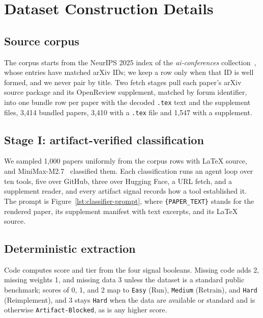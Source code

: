 \section{Dataset Construction Details}
\label{app:construction}

\subsection{Source corpus}
\label{app:corpus}

The corpus starts from the NeurIPS 2025 index of the \emph{ai-conferences}
collection~\citep{neurips2025corpus}, whose entries have matched arXiv IDs; we
keep a row only when that ID is well formed, and we never pair by title. Two
fetch stages pull each paper's arXiv source package and its OpenReview supplement,
matched by forum identifier, into one bundle row per paper with the decoded
\texttt{.tex} text and the supplement files, 3,414 bundled papers, 3,410 with
a \texttt{.tex} file and 1,547 with a supplement.

\subsection{Stage I: artifact-verified classification}
\label{app:classifier}

We sampled 1,000 papers uniformly from the corpus rows with LaTeX source, and
MiniMax-M2.7~\citep{minimax2026m2} classified them.
Each classification runs an agent loop over ten tools, five over GitHub, three
over Hugging Face, a URL fetch, and a supplement reader, and every artifact
signal records how a tool established it. The prompt is
Figure~\ref{lst:classifier-prompt}, where \texttt{\{PAPER\_TEXT\}} stands for
the rendered paper, its supplement manifest with text excerpts, and its LaTeX
source.

\subsection{Deterministic extraction}
\label{app:extraction}

Code computes score and tier from the four signal booleans. Missing code adds
2, missing weights 1, and missing data 3 unless the dataset is a standard
public benchmark; scores of 0, 1, and 2 map to \texttt{Easy} (Run),
\texttt{Medium} (Retrain), and \texttt{Hard} (Reimplement), and 3 stays
\texttt{Hard} when the data are available or standard and is otherwise
\texttt{Artifact-Blocked}, as is any higher score.

